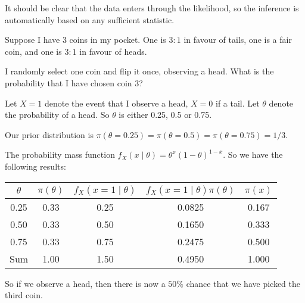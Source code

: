 \documentclass[a4paper]{article}
\begin{document}
It should be clear that the data enters through the likelihood, so the inference is automatically based on any sufficient statistic.

\begin{eg}
  Suppose I have $3$ coins in my pocket. One is $3:1$ in favour of tails, one is a fair coin, and one is $3:1$ in favour of heads.

  I randomly select one coin and flip it once, observing a head. What is the probability that I have chosen coin 3?

  Let $X = 1$ denote the event that I observe a head, $X = 0$ if a tail. Let $\theta$ denote the probability of a head. So $\theta$ is either 0.25, 0.5 or 0.75.

  Our prior distribution is $\pi(\theta = 0.25) = \pi(\theta = 0.5) = \pi(\theta = 0.75) = 1/3$.

  The probability mass function $f_X(x\mid \theta) = \theta^x(1 - \theta)^{1 - x}$. So we have the following results:
  \begin{center}
    \begin{tabular}{ccccc}
      \toprule
      $\theta$ & $\pi(\theta)$ & $f_X(x = 1\mid \theta)$ & $f_X(x = 1\mid \theta)\pi(\theta)$ & $\pi(x)$\\
      \midrule
      0.25 & 0.33 & 0.25 & 0.0825 & 0.167\\
      0.50 & 0.33 & 0.50 & 0.1650 & 0.333\\
      0.75 & 0.33 & 0.75 & 0.2475 & 0.500\\
      \midrule
      Sum & 1.00 & 1.50 & 0.4950 & 1.000\\
      \bottomrule
    \end{tabular}
  \end{center}
  So if we observe a head, then there is now a $50\%$ chance that we have picked the third coin.
\end{eg}
\end{document}
